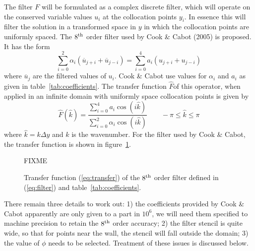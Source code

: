 The filter $F$ will be formulated as a complex discrete filter, which
will operate on the conserved variable values $u_i$ at the collocation
points $y_i$. In essence this will filter the solution in a transformed
space in $y$ in which the collocation points are uniformly spaced. The
$8^{\rm th}$ order filter used by Cook \& Cabot (2005) is proposed. It
has the form
\begin{equation}
\sum_{i=0}^2 \alpha_i(\overline u_{j+i} + \overline u_{j-i}) = \sum_{i=0}^4
 a_i(u_{j+i}+u_{j-i})
\label{eq:filter}
\end{equation}
where $\overline u_j$ are the filtered values of $u_i$. Cook \& Cabot use
values for $\alpha_i$ and $a_i$ as given in table~\ref{tab:coefficients}. The transfer
function $\hat F$of this operator, when applied in an infinite domain with
uniformly space collocation points is given by
\begin{equation}
\hat F(\hat k)=\frac{\sum_{i=0}^4a_i\cos(i\hat
 k)}{\sum_{i=0}^2\alpha_i\cos(i\hat k)}\qquad -\pi\leq\hat k\leq\pi
\label{eq:transfer}
\end{equation}
where $\hat k=k\Delta y$ and $k$ is the wavenumber. For the filter used
by Cook \& Cabot, the transfer function is shown in figure~\ref{fig:transfer}.

\begin{figure}[t]
\begin{center}
FIXME
\end{center}
 \caption{Transfer function (\ref{eq:transfer}) of the $8^{\rm th}$ order filter defined in
 (\ref{eq:filter}) and table~\ref{tab:coefficients}.}
\label{fig:transfer}
\end{figure}

There remain three details to work out: 1) the coefficients provided by
Cook \& Cabot apparently are only given to a part in $10^6$, we will
need them specified to machine precision to retain the $8^{\rm th}$
order accuracy; 2) the filter stencil is quite wide, so that for points
near the wall, the stencil will fall outside the domain; 3) the value of
$\phi$ needs to be selected. Treatment of
these issues is discussed below.

